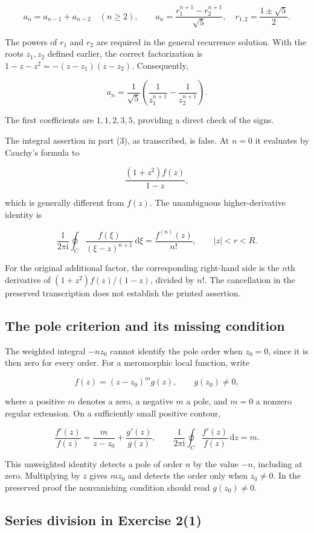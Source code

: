 \documentclass[11pt,a4paper]{article}
\theoremstyle{definition}
\theoremstyle{plain}
\begin{document}
\[
a_n=a_{n-1}+a_{n-2}\quad(n\ge2),\qquad
a_n=\frac{r_1^{n+1}-r_2^{n+1}}{\sqrt5},
\quad r_{1,2}=\frac{1\pm\sqrt5}{2}.
\]

The powers of $r_1$ and $r_2$ are required in the general recurrence solution. With the roots $z_1,z_2$ defined earlier, the correct factorization is $1-z-z^2=-(z-z_1)(z-z_2)$. Consequently,

\[
a_n=\frac1{\sqrt5}\left(\frac1{z_1^{n+1}}-\frac1{z_2^{n+1}}\right).
\]

The first coefficients are $1,1,2,3,5$, providing a direct check of the signs.

The integral assertion in part (3), as transcribed, is false. At $n=0$ it evaluates by Cauchy's formula to

\[
\frac{(1+z^2)f(z)}{1-z},
\]

which is generally different from $f(z)$. The unambiguous higher-derivative identity is

\[
\frac1{2\pi\mathrm{i}}\oint_C
\frac{f(\xi)}{(\xi-z)^{n+1}}\,\mathrm{d}\xi
=\frac{f^{(n)}(z)}{n!},\qquad |z|<r<R.
\]

For the original additional factor, the corresponding right-hand side is the $n$th derivative of $(1+z^2)f(z)/(1-z)$, divided by $n!$. The cancellation in the preserved transcription does not establish the printed assertion.

\subsection{The pole criterion and its missing condition}

The weighted integral $-nz_0$ cannot identify the pole order when $z_0=0$, since it is then zero for every order. For a meromorphic local function, write

\[
f(z)=(z-z_0)^m g(z),\qquad g(z_0)\ne0,
\]

where a positive $m$ denotes a zero, a negative $m$ a pole, and $m=0$ a nonzero regular extension. On a sufficiently small positive contour,

\[
\frac{f'(z)}{f(z)}=\frac m{z-z_0}+\frac{g'(z)}{g(z)},\qquad
\frac1{2\pi\mathrm{i}}\oint_C\frac{f'(z)}{f(z)}\,\mathrm{d}z=m.
\]

This unweighted identity detects a pole of order $n$ by the value $-n$, including at zero. Multiplying by $z$ gives $mz_0$ and detects the order only when $z_0\ne0$. In the preserved proof the nonvanishing condition should read $g(z_0)\ne0$.

\subsection{Series division in Exercise 2(1)}
\end{document}

